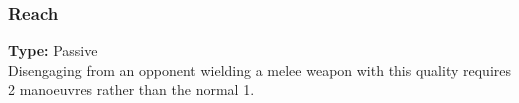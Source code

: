 \subsubsection{Reach}
\label{iqty:reach}
\textbf{Type:} Passive\\
Disengaging from an opponent wielding a melee weapon
with this quality requires 2 manoeuvres rather than the
normal 1.

